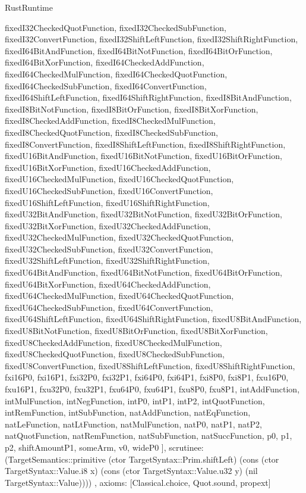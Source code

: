 \begin{lexlean}{RustRuntime}
\begin{semanticmodule}
{{      fixedI32CheckedQuotFunction,
      fixedI32CheckedSubFunction,
      fixedI32ConvertFunction,
      fixedI32ShiftLeftFunction,
      fixedI32ShiftRightFunction,
      fixedI64BitAndFunction,
      fixedI64BitNotFunction,
      fixedI64BitOrFunction,
      fixedI64BitXorFunction,
      fixedI64CheckedAddFunction,
      fixedI64CheckedMulFunction,
      fixedI64CheckedQuotFunction,
      fixedI64CheckedSubFunction,
      fixedI64ConvertFunction,
      fixedI64ShiftLeftFunction,
      fixedI64ShiftRightFunction,
      fixedI8BitAndFunction,
      fixedI8BitNotFunction,
      fixedI8BitOrFunction,
      fixedI8BitXorFunction,
      fixedI8CheckedAddFunction,
      fixedI8CheckedMulFunction,
      fixedI8CheckedQuotFunction,
      fixedI8CheckedSubFunction,
      fixedI8ConvertFunction,
      fixedI8ShiftLeftFunction,
      fixedI8ShiftRightFunction,
      fixedU16BitAndFunction,
      fixedU16BitNotFunction,
      fixedU16BitOrFunction,
      fixedU16BitXorFunction,
      fixedU16CheckedAddFunction,
      fixedU16CheckedMulFunction,
      fixedU16CheckedQuotFunction,
      fixedU16CheckedSubFunction,
      fixedU16ConvertFunction,
      fixedU16ShiftLeftFunction,
      fixedU16ShiftRightFunction,
      fixedU32BitAndFunction,
      fixedU32BitNotFunction,
      fixedU32BitOrFunction,
      fixedU32BitXorFunction,
      fixedU32CheckedAddFunction,
      fixedU32CheckedMulFunction,
      fixedU32CheckedQuotFunction,
      fixedU32CheckedSubFunction,
      fixedU32ConvertFunction,
      fixedU32ShiftLeftFunction,
      fixedU32ShiftRightFunction,
      fixedU64BitAndFunction,
      fixedU64BitNotFunction,
      fixedU64BitOrFunction,
      fixedU64BitXorFunction,
      fixedU64CheckedAddFunction,
      fixedU64CheckedMulFunction,
      fixedU64CheckedQuotFunction,
      fixedU64CheckedSubFunction,
      fixedU64ConvertFunction,
      fixedU64ShiftLeftFunction,
      fixedU64ShiftRightFunction,
      fixedU8BitAndFunction,
      fixedU8BitNotFunction,
      fixedU8BitOrFunction,
      fixedU8BitXorFunction,
      fixedU8CheckedAddFunction,
      fixedU8CheckedMulFunction,
      fixedU8CheckedQuotFunction,
      fixedU8CheckedSubFunction,
      fixedU8ConvertFunction,
      fixedU8ShiftLeftFunction,
      fixedU8ShiftRightFunction,
      fxi16P0,
      fxi16P1,
      fxi32P0,
      fxi32P1,
      fxi64P0,
      fxi64P1,
      fxi8P0,
      fxi8P1,
      fxu16P0,
      fxu16P1,
      fxu32P0,
      fxu32P1,
      fxu64P0,
      fxu64P1,
      fxu8P0,
      fxu8P1,
      intAddFunction,
      intMulFunction,
      intNegFunction,
      intP0,
      intP1,
      intP2,
      intQuotFunction,
      intRemFunction,
      intSubFunction,
      natAddFunction,
      natEqFunction,
      natLeFunction,
      natLtFunction,
      natMulFunction,
      natP0,
      natP1,
      natP2,
      natQuotFunction,
      natRemFunction,
      natSubFunction,
      natSuccFunction,
      p0,
      p1,
      p2,
      shiftAmountP1,
      someArm,
      v0,
      wideP0
    ],
    scrutinee: (TargetSemantics::primitive (ctor TargetSyntax::Prim.shiftLeft) (cons (ctor TargetSyntax::Value.i8 x) (cons (ctor TargetSyntax::Value.u32 y) (nil TargetSyntax::Value))))
  },
  axioms: [Classical.choice, Quot.sound, propext]
}


\end{semanticmodule}
\end{lexlean}
